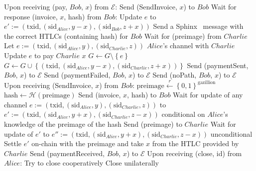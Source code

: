 \begin{algorithmic}[1]
      \EndIf
    \State
    \State Upon receiving (pay, $Bob$, $x$) from $\mathcal{E}$:
      \State Send (SendInvoice, $x$) to $Bob$
      \State Wait for response (invoice, $x$, hash) from $Bob$:
        \State Update $e$ to $e' := \left(\mathrm{txid},
        \left(\mathrm{sid}_{Alice}, y - x\right),
        \left(\mathrm{sid}_{Bob}, z + x\right)\right)$ 
        \State Send a Sphinx~\cite{sphinx} message with the correct HTLCs (containing
        hash) for $Bob$
        \State {}
        \State Wait for (preimage) from $Charlie$
          \State Let $e := \left(\mathrm{txid}, \left(\mathrm{sid}_{Alice}, y\right),
          \left(\mathrm{sid}_{Charlie}, z\right)\right)$ $Alice$'s channel with $Charlie$
          \State Update $e$ to pay $Charlie$ $x$ 
          \State $G \leftarrow G \setminus \left\{e\right\}$
          \State $G \leftarrow G \cup \left\{\left(\mathrm{txid},
          \left(\mathrm{sid}_{Alice}, y - x\right), \left(\mathrm{sid}_{Charlie}, z +
          x\right)\right)\right\}$
          \State Send (paymentSent, $Bob$, $x$) to $\mathcal{E}$
        \Else
          \State Send (paymentFailed, $Bob$, $x$) to $\mathcal{E}$
        \EndIf
      \Else
        \State Send (noPath, $Bob$, $x$) to $\mathcal{E}$
      \EndIf
    \State
    \State Upon receiving (SendInvoice, $x$) from $Bob$:
      \State $\mathrm{preimage} \overset{r}{\leftarrow}
      \left\{0,1\right\}^{\mathrm{gazillion}}$
      \State $\mathrm{hash} \leftarrow \mathcal{H}\left(\mathrm{preimage}\right)$
      \State Send (invoice, $x$, hash) to $Bob$
      \State Wait for update of any channel $e := \left(\mathrm{txid},
      \left(\mathrm{sid}_{Alice}, y\right), \left(\mathrm{sid}_{Charlie}, z\right)\right)$
      to $e' := \left(\mathrm{txid}, \left(\mathrm{sid}_{Alice}, y + x\right),
      \left(\mathrm{sid}_{Charlie}, z - x\right)\right)$ conditional on $Alice$'s
      knowledge of the preimage of the hash
      \State Send (preimage) to $Charlie$
      \State Wait for update of $e'$ to $e'' := \left(\mathrm{txid},
      \left(\mathrm{sid}_{Alice}, y + x\right), \left(\mathrm{sid}_{Charlie}, z -
      x\right)\right)$ unconditional
        \State Settle $e'$ on-chain with the preimage and take $x$ from the HTLC provided
        by $Charlie$
      \EndIf
      \State Send (paymentReceived, $Bob$, $x$) to $\mathcal{E}$
    \State
    \State Upon receiving (close, id) from $Alice$:
        \State Try to close cooperatively 
         
          \State Close unilaterally 
        \EndIf
      \EndIf
  \end{algorithmic}
